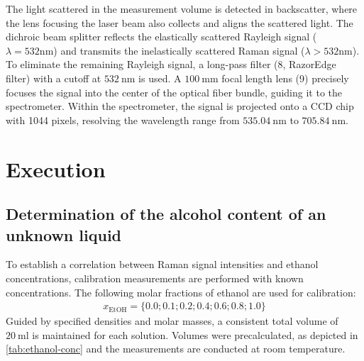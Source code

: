 The light scattered in the measurement volume is detected in backscatter, where the lens focusing the laser beam also collects and aligns the scattered light. The dichroic beam splitter reflects the elastically scattered Rayleigh signal ($\lambda = 532 \mathrm{nm}$) and transmits the inelastically scattered Raman signal ($\lambda > 532 \mathrm{nm}$). To eliminate the remaining Rayleigh signal, a long-pass filter (8, RazorEdge\textsuperscript{\textcopyright} filter) with a cutoff at $532~\mathrm{nm}$ is used. A $100~\mathrm{mm}$ focal length lens (9) precisely focuses the signal into the center of the optical fiber bundle, guiding it to the spectrometer. Within the spectrometer, the signal is projected onto a CCD chip with 1044 pixels, resolving the wavelength range from $535.04~\mathrm{nm}$ to $705.84~\mathrm{nm}$.

\section{Execution}

\subsection{Determination of the alcohol content of an unknown liquid}

To establish a correlation between Raman signal intensities and ethanol concentrations, calibration measurements are performed with known concentrations. The following molar fractions of ethanol are used for calibration:
\begin{align}
    x_\mathrm{EtOH}=\{0.0; 0.1; 0.2; 0.4; 0.6; 0.8; 1.0\} \nonumber
\end{align}
Guided by specified densities and molar masses, a consistent total volume of $20~\mathrm{ml}$ is maintained for each solution. Volumes were precalculated, as depicted in \autoref{tab:ethanol-conc} and the measurements are conducted at room temperature.

